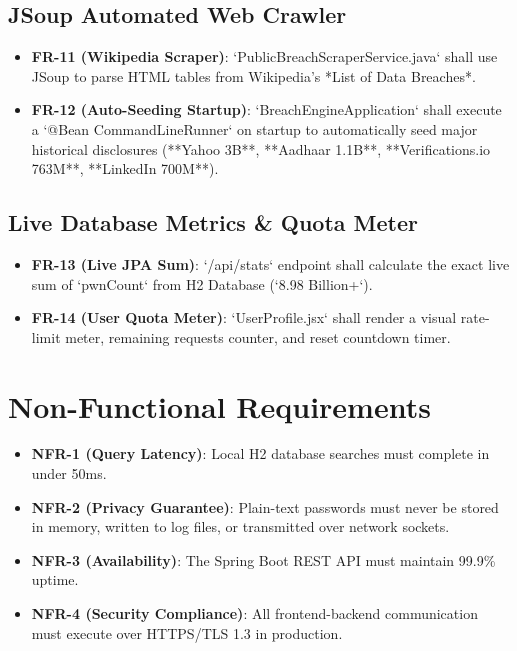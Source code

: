 \documentclass[12pt,a4paper,oneside]{report}
\begin{document}
\subsection{JSoup Automated Web Crawler}
\begin{itemize}
    \item \textbf{FR-11 (Wikipedia Scraper)}: `PublicBreachScraperService.java` shall use JSoup to parse HTML tables from Wikipedia's *List of Data Breaches*.
    \item \textbf{FR-12 (Auto-Seeding Startup)}: `BreachEngineApplication` shall execute a `@Bean CommandLineRunner` on startup to automatically seed major historical disclosures (**Yahoo 3B**, **Aadhaar 1.1B**, **Verifications.io 763M**, **LinkedIn 700M**).
\end{itemize}

\subsection{Live Database Metrics & Quota Meter}
\begin{itemize}
    \item \textbf{FR-13 (Live JPA Sum)}: `/api/stats` endpoint shall calculate the exact live sum of `pwnCount` from H2 Database (`8.98 Billion+`).
    \item \textbf{FR-14 (User Quota Meter)}: `UserProfile.jsx` shall render a visual rate-limit meter, remaining requests counter, and reset countdown timer.
\end{itemize}

\section{Non-Functional Requirements}

\begin{itemize}
    \item \textbf{NFR-1 (Query Latency)}: Local H2 database searches must complete in under 50ms.
    \item \textbf{NFR-2 (Privacy Guarantee)}: Plain-text passwords must never be stored in memory, written to log files, or transmitted over network sockets.
    \item \textbf{NFR-3 (Availability)}: The Spring Boot REST API must maintain 99.9\% uptime.
    \item \textbf{NFR-4 (Security Compliance)}: All frontend-backend communication must execute over HTTPS/TLS 1.3 in production.
\end{itemize}
\end{document}
